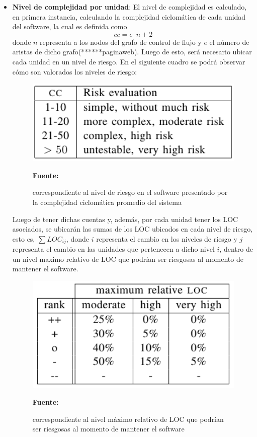\begin{itemize}
 
 \item \textbf{Nivel de complejidad por unidad}: El nivel de complejidad es calculado, en primera instancia, calculando la complejidad ciclomática de cada unidad del software, la cual es definida como $$cc = e – n + 2$$ donde $n$ representa a los nodos del grafo de control de flujo y $e$ el número de aristas de dicho grafo(******paginaweb). Luego de esto, será necesario ubicar cada unidad en un nivel de riesgo. En el siguiente cuadro se podrá observar cómo son valorados los niveles de riesgo:

\begin{figure}[!htb]
  \begin{center}
    \includegraphics[width=11cm]{./imagenes/mantainability2.png}
    \caption{correspondiente al nivel de riesgo en el software presentado por la complejidad ciclomática promedio del sistema}
    \label{fig:mantainability2}
    \textbf{Fuente:}  \cite{measuring_maintainability}
  \end{center}
\end{figure}

Luego de tener dichas cuentas y, además, por cada unidad tener los LOC asociados, se ubicarán las sumas de los LOC ubicados en cada nivel de riesgo, esto es, $\sum LOC_{ij}$, donde $i$ representa el cambio en los niveles de riesgo y $j$ representa el cambio en las unidades que pertenecen a dicho nivel $i$, dentro de un nivel maximo relativo de LOC que podrían ser riesgosas al momento de mantener el software.

\begin{figure}[!htb]
  \begin{center}
    \includegraphics[width=11cm]{./imagenes/mantainability3.png}
    \caption{correspondiente al nivel máximo relativo de LOC que podrían ser riesgosas al momento de mantener el software}
    \label{fig:mantainability3}
    \textbf{Fuente:}  \cite{measuring_maintainability}
  \end{center}
\end{figure}


\end{itemize}
